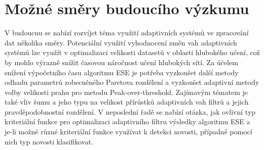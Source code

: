\section{Možné směry budoucího výzkumu}
V budoucnu se nabízí rozvíjet téma využití adaptivních systémů ve zpracování dat několika směry. Potenciální využití vyhodnocení změn vah adaptivních systémů lze využít v optimalizaci velikosti datasetů v oblasti hlubokého učení, což by mohlo výrazně snížit časovou náročnost učení hlubokých sítí. Za účelem snížení výpočetního času algoritmu ESE je potřeba vyzkoušet další metody odhadu parametrů zobecněného Paretova rozdělení a vyzkoušet adaptivní metody volby velikosti prahu pro metodu Peak-over-threshold. Zajímavým tématem je také vliv šumu a jeho typu na velikost přírůstků adaptivních vah filtrů a jejich pravděpodobnostní rozdělení. V neposlední řadě se nabízí otázka, jak ovlivní typ kriteriální funkce pro optimalizaci adaptivního filtru výsledky algoritmu ESE a je-li možné různé kriteriální funkce využívat k detekci novosti, případně pomocí nich typ novosti klasifikovat. 